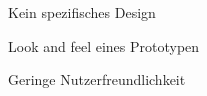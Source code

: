 \begin{frame}
\begin{block}{}
	Kein spezifisches Design
\end{block}
\begin{block}{}
	Look and feel eines Prototypen
\end{block}
\begin{block}{}
	Geringe Nutzerfreundlichkeit
\end{block}
\end{frame}